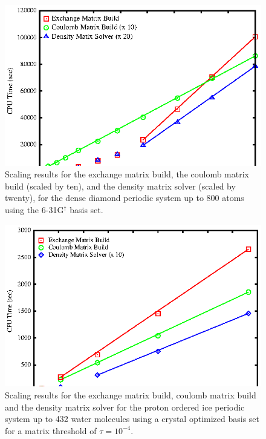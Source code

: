 \documentclass[prb,aps,nobibnotes,twocolumn,doublespace,twocolumngrid,superbib]{revtex4}
\begin{document}
\begin{figure}[p]
\caption{Scaling results for the exchange matrix build, the coulomb matrix
build (scaled by ten), and the density matrix solver (scaled by twenty),  
for the dense diamond periodic system up to 800 atoms using the
6-31G$ ^\dagger$ basis set.}
\label{figure:Scaling_Matrix_Build}
{\centering \includegraphics{Timing_Diamond_ONX.ps} \par} 
\end{figure}
%
\begin{figure}[p]
\caption{Scaling results for the exchange matrix build, coulomb matrix
build and the density matrix solver  for the proton ordered ice periodic system up to 432 water molecules 
using a crystal optimized basis set\cite{CBS:511G:H,CBS:861G:MgO} for a matrix threshold of $\tau=10^{-4}$.}
\label{figure:Scaling_Matrix_Build_Ice}
{\centering \includegraphics{Timing_pIce_ONX_1.ps} \par} 
\end{figure}
\end{document}
